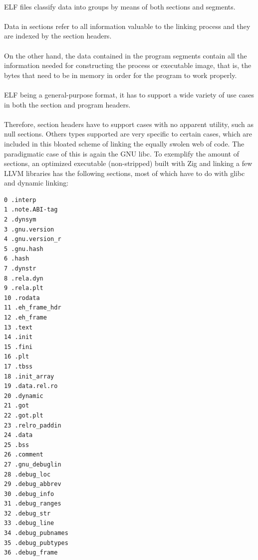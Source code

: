 \documentclass[12pt]{article}
\begin{document}
	\paragraph{}\acrshort{ELF} files classify data into groups by means of both sections and segments.
	\paragraph{}Data in sections refer to all information valuable to the linking process and they are indexed by the section headers.
	\paragraph{}On the other hand, the data contained in the program segments contain all the information needed for constructing the process or executable image, that is, the bytes that need to be in memory in order for the program to work properly.
	\paragraph{}\acrshort{ELF} being a general-purpose format, it has to support a wide variety of use cases in both the section and program headers.
	\paragraph{}Therefore, section headers have to support cases with no apparent utility, such as null sections. Others types supported are very specific to certain cases, which are included in this bloated scheme of linking the equally swolen web of code. The paradigmatic case of this is again the \acrshort{GNU} libc. To exemplify the amount of sections, an optimized executable (non-stripped) built with Zig and linking a few \acrshort{LLVM} libraries has the following sections, most of which have to do with \gls{glibc} and dynamic linking\cite{nativity}:
	\begin{verbatim}
0 .interp
1 .note.ABI-tag
2 .dynsym
3 .gnu.version 
4 .gnu.version_r
5 .gnu.hash
6 .hash
7 .dynstr
8 .rela.dyn
9 .rela.plt
10 .rodata
11 .eh_frame_hdr
12 .eh_frame
13 .text
14 .init
15 .fini
16 .plt
17 .tbss
18 .init_array
19 .data.rel.ro 
20 .dynamic
21 .got
22 .got.plt
23 .relro_paddin
24 .data
25 .bss
26 .comment
27 .gnu_debuglin
28 .debug_loc
29 .debug_abbrev
30 .debug_info
31 .debug_ranges
32 .debug_str
33 .debug_line
34 .debug_pubnames
35 .debug_pubtypes
36 .debug_frame		
	\end{verbatim}
	
\end{document}

